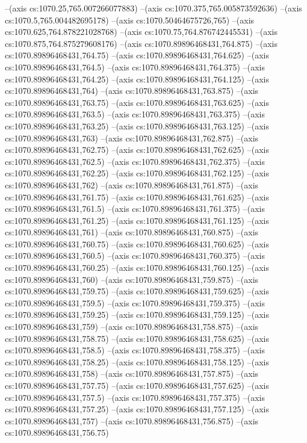 --(axis cs:1070.25,765.007266077883)
--(axis cs:1070.375,765.005873592636)
--(axis cs:1070.5,765.004482695178)
--(axis cs:1070.50464675726,765)
--(axis cs:1070.625,764.878221028768)
--(axis cs:1070.75,764.876742445531)
--(axis cs:1070.875,764.875279608176)
--(axis cs:1070.89896468431,764.875)
--(axis cs:1070.89896468431,764.75)
--(axis cs:1070.89896468431,764.625)
--(axis cs:1070.89896468431,764.5)
--(axis cs:1070.89896468431,764.375)
--(axis cs:1070.89896468431,764.25)
--(axis cs:1070.89896468431,764.125)
--(axis cs:1070.89896468431,764)
--(axis cs:1070.89896468431,763.875)
--(axis cs:1070.89896468431,763.75)
--(axis cs:1070.89896468431,763.625)
--(axis cs:1070.89896468431,763.5)
--(axis cs:1070.89896468431,763.375)
--(axis cs:1070.89896468431,763.25)
--(axis cs:1070.89896468431,763.125)
--(axis cs:1070.89896468431,763)
--(axis cs:1070.89896468431,762.875)
--(axis cs:1070.89896468431,762.75)
--(axis cs:1070.89896468431,762.625)
--(axis cs:1070.89896468431,762.5)
--(axis cs:1070.89896468431,762.375)
--(axis cs:1070.89896468431,762.25)
--(axis cs:1070.89896468431,762.125)
--(axis cs:1070.89896468431,762)
--(axis cs:1070.89896468431,761.875)
--(axis cs:1070.89896468431,761.75)
--(axis cs:1070.89896468431,761.625)
--(axis cs:1070.89896468431,761.5)
--(axis cs:1070.89896468431,761.375)
--(axis cs:1070.89896468431,761.25)
--(axis cs:1070.89896468431,761.125)
--(axis cs:1070.89896468431,761)
--(axis cs:1070.89896468431,760.875)
--(axis cs:1070.89896468431,760.75)
--(axis cs:1070.89896468431,760.625)
--(axis cs:1070.89896468431,760.5)
--(axis cs:1070.89896468431,760.375)
--(axis cs:1070.89896468431,760.25)
--(axis cs:1070.89896468431,760.125)
--(axis cs:1070.89896468431,760)
--(axis cs:1070.89896468431,759.875)
--(axis cs:1070.89896468431,759.75)
--(axis cs:1070.89896468431,759.625)
--(axis cs:1070.89896468431,759.5)
--(axis cs:1070.89896468431,759.375)
--(axis cs:1070.89896468431,759.25)
--(axis cs:1070.89896468431,759.125)
--(axis cs:1070.89896468431,759)
--(axis cs:1070.89896468431,758.875)
--(axis cs:1070.89896468431,758.75)
--(axis cs:1070.89896468431,758.625)
--(axis cs:1070.89896468431,758.5)
--(axis cs:1070.89896468431,758.375)
--(axis cs:1070.89896468431,758.25)
--(axis cs:1070.89896468431,758.125)
--(axis cs:1070.89896468431,758)
--(axis cs:1070.89896468431,757.875)
--(axis cs:1070.89896468431,757.75)
--(axis cs:1070.89896468431,757.625)
--(axis cs:1070.89896468431,757.5)
--(axis cs:1070.89896468431,757.375)
--(axis cs:1070.89896468431,757.25)
--(axis cs:1070.89896468431,757.125)
--(axis cs:1070.89896468431,757)
--(axis cs:1070.89896468431,756.875)
--(axis cs:1070.89896468431,756.75)

